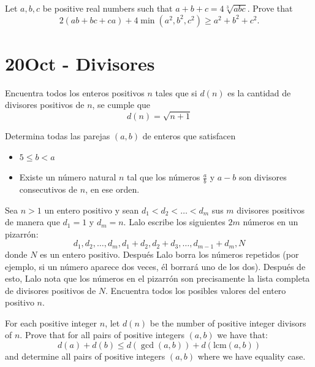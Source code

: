 \documentclass[11pt]{scrartcl}
\begin{document}
\begin{problem} %
    	Let \(a,b,c\) be positive real numbers such that \(a+b+c=4\sqrt[3]{abc}\). Prove that\[2(ab+bc+ca)+4\min(a^2,b^2,c^2)\ge a^2+b^2+c^2.\]
\end{problem}


\newpage
\section{20Oct - Divisores}

\begin{problem} %
    Encuentra todos los enteros positivos $n$ tales que si $d(n)$ es la cantidad de divisores positivos de $n$, se cumple que
    \[d(n)=\sqrt{n+1}\] 
\end{problem}

\begin{problem} %
     Determina todas las parejas $(a,b)$ de enteros que satisfacen
    \begin{itemize}
        \item $5 \leq b < a$
        \item Existe un número natural $n$ tal que los números $\frac ab$ y $a-b$ son divisores consecutivos de $n$, en ese orden.
    \end{itemize}
\end{problem}

\begin{problem} %
    
    Sea $n>1$ un entero positivo y sean $d_1 < d_2 < \dots <  d_m$ sus $m$ divisores positivos de manera que $d_1=1$ y $d_m=n$. Lalo escribe los siguientes $2m$ números en un pizarrón:
\[d_1,d_2,\dots,d_m,d_1+d_2,d_2+d_3,\dots,d_{m-1}+d_m,N\]
donde $N$ es un entero positivo. Después Lalo borra los números repetidos (por ejemplo, si un número aparece dos veces, él borrará uno de los dos). Después de esto, Lalo nota que los números en el pizarrón son precisamente la lista completa de divisores positivos de $N$. Encuentra todos los posibles valores del entero positivo $n$.
    
\end{problem}


\begin{problem} %
    	For each positive integer $n$, let $d(n)$ be the number of positive integer divisors of $n$.
Prove that for all pairs of positive integers $(a,b)$ we have that:
\[ d(a)+d(b) \le d(\gcd(a,b))+d(\text{lcm}(a,b)) \]and determine all pairs of positive integers $(a,b)$ where we have equality case.
\end{problem}
\end{document}
